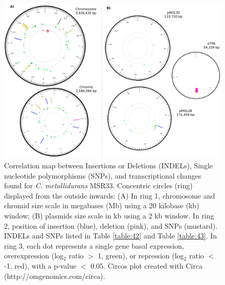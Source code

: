 \begin{figure} [ht] 
\begin{center}
\includegraphics[width=\linewidth]{chapter3/chapter/figs/genes-09-00551-g001.png}
\end{center}
\caption{Correlation map between Insertions or Deletions (INDELs), Single nucleotide polymorphisms (SNPs), and transcriptional changes found for \textit{C. metallidurans} MSR33. Concentric circles (ring) displayed from the outside inwards: (A) In ring 1, chromosome and chromid size scale in megabases (Mb) using a 20 kilobase (kb) window; (B) plasmids size scale in kb using a 2 kb window. In ring 2, position of insertion (blue), deletion (pink), and SNPs (mustard). INDELs and SNPs listed in Table \ref{table:42} and Table \ref{table:43}. In ring 3, each dot represents a single gene basal expression, overexpression (log$_2$ ratio $>$ 1, green), or repression (log$_2$ ratio $<$ -1, red), with a p-value $<$ 0.05. Circos plot created with Circa (http://omgenomics.com/circa).}
\label{chapter3-fig1}%
\end{figure}


